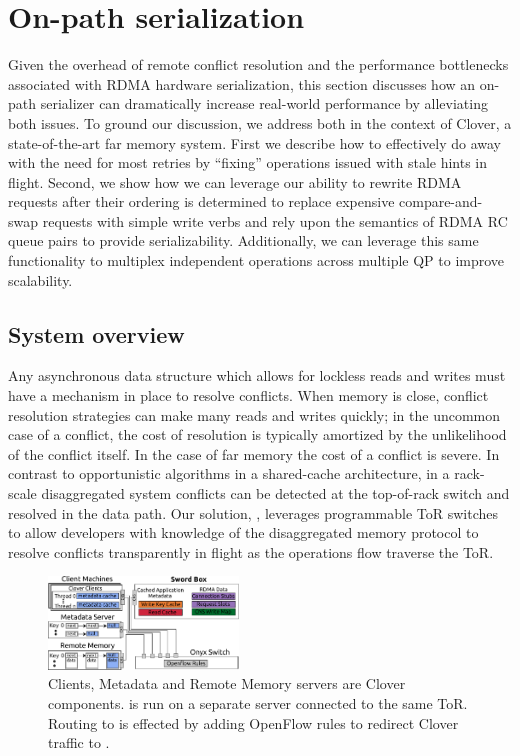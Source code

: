 \section{On-path serialization}

Given the overhead of remote conflict resolution and the performance bottlenecks
associated with RDMA hardware serialization, this section discusses how an
on-path serializer can dramatically increase real-world performance
by alleviating both issues.  To ground our discussion, we address both in the
context of Clover, a state-of-the-art far memory system. First we describe how
to effectively do away with the need for most retries by ``fixing'' operations
issued with stale hints in flight.  Second, we show how we can leverage our
ability to rewrite RDMA requests after their ordering is determined to replace
expensive compare-and-swap requests with simple write verbs and rely upon the
semantics of RDMA RC queue pairs to provide serializability.  Additionally, we
can leverage this same functionality to multiplex independent operations across
multiple QP to improve scalability.

\subsection{System overview}

Any asynchronous data structure which allows for lockless reads and
writes must have a mechanism in place to resolve conflicts. When
memory is close, conflict resolution strategies can make many reads
and writes quickly; in the uncommon case of a conflict, the cost of
resolution is typically amortized by the unlikelihood of the conflict
itself. In the case of far memory the cost of a conflict is severe. In
contrast to opportunistic algorithms in a shared-cache architecture,
in a rack-scale disaggregated system conflicts can be detected at the
top-of-rack switch and resolved in the data path. Our solution,
\sword, leverages programmable ToR switches to allow developers with
knowledge of the disaggregated memory protocol to resolve conflicts
transparently in flight as the operations flow traverse the ToR.

\begin{figure}
\center
  \includegraphics[width=0.45\textwidth]{fig/overview_2.pdf}
 
\caption{Clients, Metadata and Remote Memory servers are
Clover components. {\sword} is run on a separate server connected to the same ToR.
Routing to {\sword} is effected by adding OpenFlow rules to redirect Clover traffic to \sword.}
\label{fig:overview} \end{figure}

